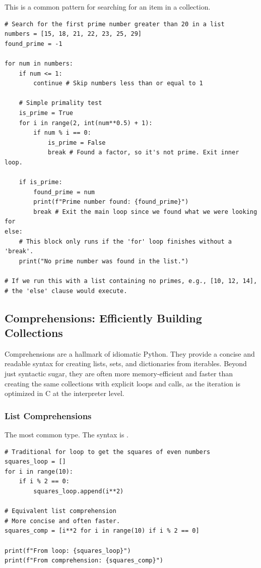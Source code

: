 \begin{example}
This is a common pattern for searching for an item in a collection.
\text{ }\begin{verbatim}
# Search for the first prime number greater than 20 in a list
numbers = [15, 18, 21, 22, 23, 25, 29]
found_prime = -1

for num in numbers:
    if num <= 1:
        continue # Skip numbers less than or equal to 1

    # Simple primality test
    is_prime = True
    for i in range(2, int(num**0.5) + 1):
        if num % i == 0:
            is_prime = False
            break # Found a factor, so it's not prime. Exit inner loop.
    
    if is_prime:
        found_prime = num
        print(f"Prime number found: {found_prime}")
        break # Exit the main loop since we found what we were looking for
else:
    # This block only runs if the 'for' loop finishes without a 'break'.
    print("No prime number was found in the list.")

# If we run this with a list containing no primes, e.g., [10, 12, 14],
# the 'else' clause would execute.
\end{verbatim}
\end{example}

\subsection{Comprehensions: Efficiently Building Collections}
\label{subsec:comprehensions}
Comprehensions are a hallmark of idiomatic Python. They provide a concise and readable syntax for creating lists, sets, and dictionaries from iterables. Beyond just syntactic sugar, they are often more memory-efficient and faster than creating the same collections with explicit  loops and  calls, as the iteration is optimized in C at the interpreter level.

\subsubsection*{List Comprehensions}
The most common type. The syntax is .

\text{ }\begin{verbatim}
# Traditional for loop to get the squares of even numbers
squares_loop = []
for i in range(10):
    if i % 2 == 0:
        squares_loop.append(i**2)

# Equivalent list comprehension
# More concise and often faster.
squares_comp = [i**2 for i in range(10) if i % 2 == 0]

print(f"From loop: {squares_loop}")
print(f"From comprehension: {squares_comp}")
\end{verbatim}

